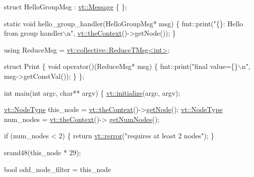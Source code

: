 \begin{DoxyCodeInclude}
\textcolor{keyword}{struct }HelloGroupMsg : \hyperlink{structvt_1_1messaging_1_1_active_msg}{vt::Message} \{ \};

\textcolor{keyword}{static} \textcolor{keywordtype}{void} hello\_group\_handler(HelloGroupMsg* msg) \{
  fmt::print(\textcolor{stringliteral}{"\{\}: Hello from group handler\(\backslash\)n"}, \hyperlink{namespacevt_a26551fe0e6e6a1371111df5b12c7e92c}{vt::theContext}()->getNode());
\}

\textcolor{keyword}{using} ReduceMsg = \hyperlink{structvt_1_1collective_1_1reduce_1_1operators_1_1_reduce_t_msg}{vt::collective::ReduceTMsg<int>};

\textcolor{keyword}{struct }Print \{
  \textcolor{keywordtype}{void} operator()(ReduceMsg* msg) \{
    fmt::print(\textcolor{stringliteral}{"final value=\{\}\(\backslash\)n"}, msg->getConstVal());
  \}
\};

\textcolor{keywordtype}{int} main(\textcolor{keywordtype}{int} argc, \textcolor{keywordtype}{char}** argv) \{
  \hyperlink{namespacevt_aae6ab5af3e11886ce73c4c3ffa008201}{vt::initialize}(argc, argv);

  \hyperlink{namespacevt_a866da9d0efc19c0a1ce79e9e492f47e2}{vt::NodeType} this\_node = \hyperlink{namespacevt_a26551fe0e6e6a1371111df5b12c7e92c}{vt::theContext}()->\hyperlink{structvt_1_1ctx_1_1_context_a0d52c263ce8516546a67443d9a86fa5f}{getNode}();
  \hyperlink{namespacevt_a866da9d0efc19c0a1ce79e9e492f47e2}{vt::NodeType} num\_nodes = \hyperlink{namespacevt_a26551fe0e6e6a1371111df5b12c7e92c}{vt::theContext}()->
      \hyperlink{structvt_1_1ctx_1_1_context_a7f41071aadf6d5fa9e1b6c703c5ff19d}{getNumNodes}();

  \textcolor{keywordflow}{if} (num\_nodes < 2) \{
    \textcolor{keywordflow}{return} \hyperlink{namespacevt_aff96ace008dc847d4c0f44cfa5dfb3a0}{vt::rerror}(\textcolor{stringliteral}{"requires at least 2 nodes"});
  \}

  srand48(this\_node * 29);

  \textcolor{keywordtype}{bool} odd\_node\_filter = this\_node %


\end{DoxyCodeInclude}
